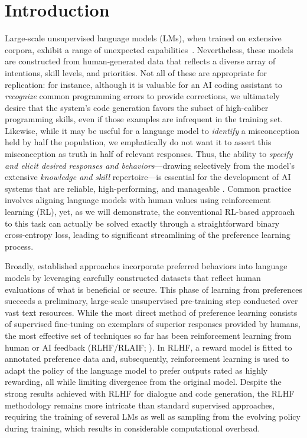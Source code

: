 \section{Introduction}
Large-scale unsupervised language models (LMs), when trained on extensive corpora, exhibit a range of unexpected capabilities~\citep{chowdhery2022palm, brown2020language, touvron2023llama,bubeck2023sparks}. Nevertheless, these models are constructed from human-generated data that reflects a diverse array of intentions, skill levels, and priorities. Not all of these are appropriate for replication: for instance, although it is valuable for an AI coding assistant to \textit{recognize} common programming errors to provide corrections, we ultimately desire that the system’s code generation favors the subset of high-caliber programming skills, even if those examples are infrequent in the training set. Likewise, while it may be useful for a language model to \textit{identify} a misconception held by half the population, we emphatically do not want it to assert this misconception as truth in half of relevant responses. Thus, the ability to \emph{specify and elicit desired responses and behaviors}—drawing selectively from the model's extensive \textit{knowledge and skill} repertoire—is essential for the development of AI systems that are reliable, high-performing, and manageable \citep{ouyang2022training}. Common practice involves aligning language models with human values using reinforcement learning (RL), yet, as we will demonstrate, the conventional RL-based approach to this task can actually be solved exactly through a straightforward binary cross-entropy loss, leading to significant streamlining of the preference learning process.

Broadly, established approaches incorporate preferred behaviors into language models by leveraging carefully constructed datasets that reflect human evaluations of what is beneficial or secure. This phase of learning from preferences succeeds a preliminary, large-scale unsupervised pre-training step conducted over vast text resources. While the most direct method of preference learning consists of supervised fine-tuning on exemplars of superior responses provided by humans, the most effective set of techniques so far has been reinforcement learning from human or AI feedback (RLHF/RLAIF; \citep{christiano2017deep,bai2022constitutional}). In RLHF, a reward model is fitted to annotated preference data and, subsequently, reinforcement learning is used to adapt the policy of the language model to prefer outputs rated as highly rewarding, all while limiting divergence from the original model. Despite the strong results achieved with RLHF for dialogue and code generation, the RLHF methodology remains more intricate than standard supervised approaches, requiring the training of several LMs as well as sampling from the evolving policy during training, which results in considerable computational overhead.

